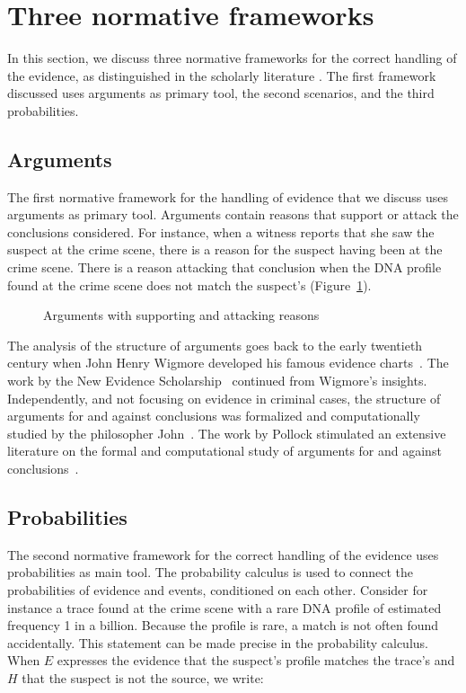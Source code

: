 \documentclass[10pt]{article}
\begin{document}
\section{Three normative frameworks}
\label{sec:frameworks}

In this section, we discuss three normative frameworks for the correct handling of the evidence, as distinguished in the scholarly literature \citep{andersonEtal2005,kapteinEtal2009,dawidEtal2011}. The first framework discussed uses arguments as primary tool, the second scenarios, and the third probabilities. 

\subsection{Arguments}

The first normative framework for the handling of evidence that we discuss uses arguments as primary tool. Arguments contain reasons that support or attack the conclusions considered. For instance, when a witness reports that she saw the suspect at the crime scene, there is a reason for the suspect having been at the crime scene. There is a reason attacking that conclusion when the DNA profile found at the crime scene does not match the suspect's (Figure~\ref{fig:arg}). 

\begin{figure}[bt]
\centering

\caption{Arguments with supporting and attacking reasons\label{fig:arg}}
\end{figure}

The analysis of the structure of arguments goes back to the early twentieth century when John Henry Wigmore developed his famous evidence charts~\citep{wigmore1913,wigmore1931}. The work by the New Evidence Scholarship~\citep{andersonEtal2005} continued from Wigmore's insights. Independently, and not focusing on evidence in criminal cases, the structure of arguments for and against conclusions was formalized and computationally studied by the philosopher John~\citet{pollock1987,pollock1995}. The work by Pollock stimulated an extensive literature on the formal and computational study of arguments for and against conclusions~\citep{vanEemerenEtal2014Ch11}.

\subsection{Probabilities}
The second normative framework for the correct handling of the evidence uses probabilities as main tool. The probability calculus is used to connect the probabilities of evidence and events, conditioned on each other. Consider for instance a trace found at the crime scene with a rare DNA profile of estimated frequency 1 in a billion. Because the profile is rare, a match is not often found accidentally. This statement can be made precise in the probability calculus. When $E$ expresses the evidence that the suspect's profile matches the trace's and $H$ that the suspect is not the source, we write:
\end{document}
